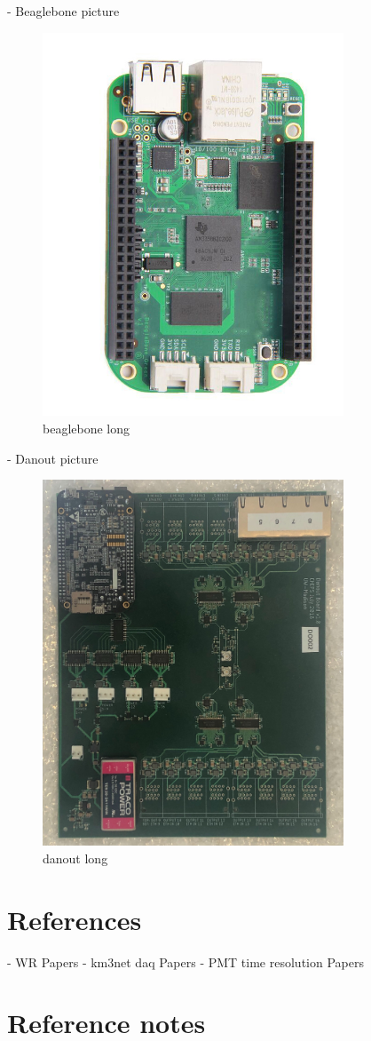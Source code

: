 - Beaglebone picture
\begin{figure}
    \includegraphics[width=0.8\textwidth]{diagrams/5-daq/beaglebone.jpg}
    \caption[beaglebone short]{beaglebone long}
    \label{fig:beaglebone}
\end{figure}
- Danout picture
\begin{figure}
    \includegraphics[angle=90,origin=c,width=0.8\textwidth]{diagrams/5-daq/danout.jpg}
    \caption[danout short]{danout long}
    \label{fig:danout}
\end{figure}

\section{References}

- WR Papers
- km3net daq Papers
- PMT time resolution Papers

\section{Reference notes}